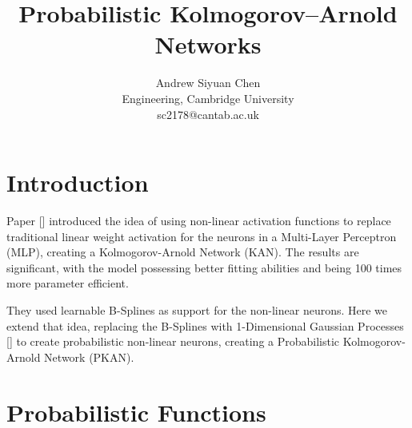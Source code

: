 \documentclass{article}
\title{Probabilistic Kolmogorov–Arnold Networks}
\author{Andrew Siyuan Chen \\
        Engineering, Cambridge University \\
        sc2178@cantab.ac.uk}
\begin{document}
\maketitle

\section{Introduction}

Paper [\cite{KAN}] introduced the idea of using non-linear activation functions to replace traditional linear weight activation for the neurons in a Multi-Layer Perceptron (MLP), creating a Kolmogorov-Arnold Network (KAN). The results are significant, with the model possessing better fitting abilities and being 100 times more parameter efficient.

They used learnable B-Splines as support for the non-linear neurons. Here we extend that idea, replacing the B-Splines with 1-Dimensional Gaussian Processes [\cite{Gaussian-Processes-for-Machine-Learning}] to create probabilistic non-linear neurons, creating a Probabilistic Kolmogorov-Arnold Network (PKAN).

\section{Probabilistic Functions}
\end{document}
